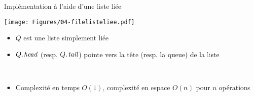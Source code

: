 \begin{frame}{Implémentation à l'aide d'une liste liée}
\centerline{\texttt{[image: Figures/04-filelisteliee.pdf]}}
\begin{itemize}
\item $Q$ est une liste simplement liée
\item $\attrib{Q}{head}$ (resp. $\attrib{Q}{tail}$) pointe vers la tête (resp. la queue) de la liste

\begin{center}
\begin{small}
~~~~~
\end{small}
\end{center}

\item Complexité en temps $O(1)$, complexité en espace $O(n)$ pour $n$ opérations
\end{itemize}

\end{frame}

